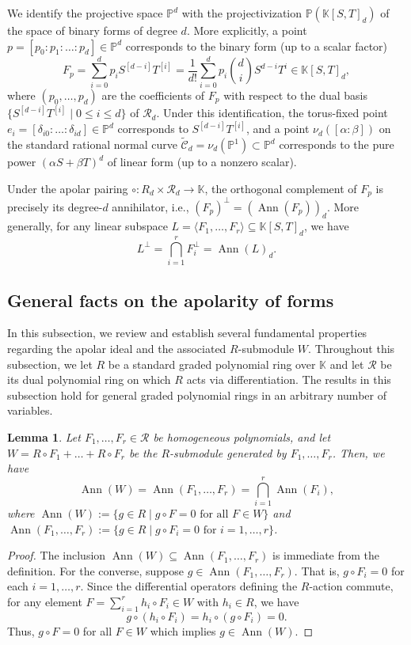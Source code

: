 \documentclass[a4paper, 11pt]{amsart}
\numberwithin{theorem}{section}
\newtheorem{lemma}[theorem]{Lemma}
\theoremstyle{definition}
\numberwithin{equation}{section}
\DeclareMathOperator{\Ann}{\operatorname{Ann}}
\begin{document}
We identify the projective space $\mathbb{P}^d$ with the projectivization $\mathbb{P}(\mathbb{K}[S,T]_d)$ of the space of binary forms of degree $d$.
More explicitly, a point $p = [p_0 : p_1 : \dots : p_d] \in \mathbb{P}^d$ corresponds to the binary form (up to a scalar factor)
\[
F_p = \sum_{i=0}^d p_i S^{[d-i]} T^{[i]} = \frac{1}{d!} \sum_{i=0}^d p_i \binom{d}{i} S^{d-i} T^i \in \mathbb{K}[S,T]_d,
\]
where $(p_0, \dots, p_d)$ are the coefficients of $F_p$ with respect to the dual basis $\{S^{[d-i]}T^{[i]} \mid 0 \leq i \leq d\}$ of $\mathcal{R}_d$.
Under this identification, the torus-fixed point $e_i = [\delta_{i0} : \dots : \delta_{id}] \in \mathbb{P}^d$ corresponds to $S^{[d-i]}T^{[i]}$, and a point $\nu_d([\alpha:\beta])$ on the standard rational normal curve $\widetilde{\mathcal{C}}_d = \nu_d(\mathbb{P}^1) \subset \mathbb{P}^d$ corresponds to the pure power $(\alpha S + \beta T)^d$ of linear form (up to a nonzero scalar).

Under the apolar pairing $\circ : R_d \times \mathcal{R}_d \to \mathbb{K}$, the orthogonal complement of $F_p$ is precisely its degree-$d$ annihilator, i.e., $(F_p)^\perp = (\Ann(F_p))_d$. 
More generally, for any linear subspace $L = \langle F_1, \dots, F_r \rangle \subseteq \mathbb{K}[S,T]_d$, we have
\[
L^\perp = \bigcap_{i=1}^r F_i^\perp = \Ann(L)_d.
\]

\subsection{General facts on the apolarity of forms}\label{subsec:general_apolarity}
In this subsection, we review and establish several fundamental properties regarding the apolar ideal and the associated $R$-submodule $W$.
Throughout this subsection, we let $R$ be a standard graded polynomial ring over $\mathbb{K}$ and let $\mathcal{R}$ be its dual polynomial ring on which $R$ acts via differentiation.
The results in this subsection hold for general graded polynomial rings in an arbitrary number of variables.

\begin{lemma}\label{lem:ann_equality}
Let $F_1, \dots, F_r \in \mathcal{R}$ be homogeneous polynomials, and let $W = R \circ F_1 + \dots + R \circ F_r$ be the $R$-submodule generated by $F_1, \dots, F_r$. 
Then, we have 
\[
\Ann(W) = \Ann(F_1, \dots, F_r) = \bigcap_{i=1}^r \Ann(F_i),
\]
where $\Ann(W) := \{g \in R \mid g \circ F = 0 \text{ for all } F \in W\}$ and $\Ann(F_1, \dots, F_r) := \{g \in R \mid g \circ F_i = 0 \text{ for } i = 1, \dots, r\}$.
\end{lemma}
\begin{proof}
The inclusion $\Ann(W) \subseteq \Ann(F_1, \dots, F_r) $ is immediate from the definition. 
For the converse, suppose $g \in \Ann(F_1, \dots, F_r)$. 
That is, $g \circ F_i = 0$ for each $i = 1, \dots, r$. 
Since the differential operators defining the $R$-action commute, for any element $F = \sum_{i=1}^r h_i \circ F_i \in W$ with $h_i \in R$, we have 
\[
g \circ (h_i \circ F_i) = h_i \circ (g \circ F_i) = 0.
\]
Thus, $g \circ F = 0$ for all $F \in W$ which implies $g \in \Ann(W)$.
\end{proof}
\end{document}
